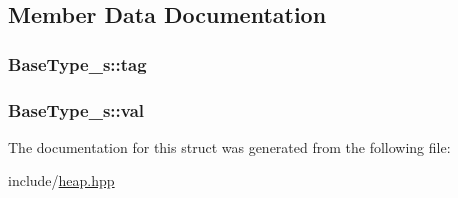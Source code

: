 \subsection{Member Data Documentation}
\hypertarget{structBaseType__s_ac322ffb6eecffd6faf80113b91dc9f50}{
\subsubsection[{tag}]{ Base\+Type\+\_\+s\+::tag}}\label{structBaseType__s_ac322ffb6eecffd6faf80113b91dc9f50}
\hypertarget{structBaseType__s_ac5f95f494b8b6612055e4bce8a07ddca}{
\subsubsection[{val}]{ Base\+Type\+\_\+s\+::val}}\label{structBaseType__s_ac5f95f494b8b6612055e4bce8a07ddca}


The documentation for this struct was generated from the following file\+:\begin{DoxyCompactItemize}
\item 
include/\hyperlink{heap_8hpp}{heap.\+hpp}\end{DoxyCompactItemize}
